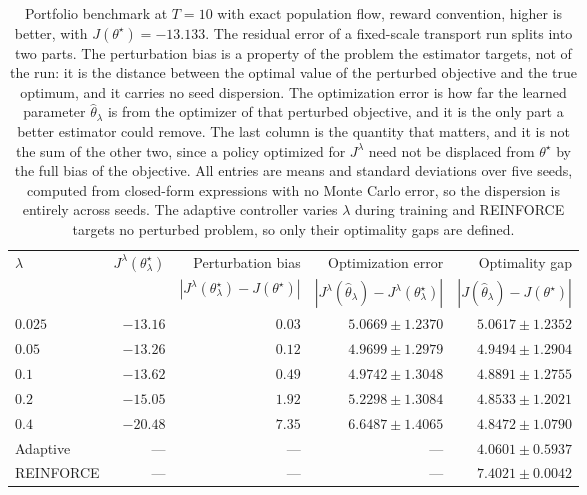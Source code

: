 \begin{table}[H]
\centering
\small
\begin{tabular}{lrrrr}
\toprule
$\lambda$ & $J^\lambda(\theta_\lambda^\star)$ & Perturbation bias & Optimization error & Optimality gap \\
& & $|J^\lambda(\theta_\lambda^\star)-J(\theta^\star)|$ & $|J^\lambda(\widehat\theta_\lambda)-J^\lambda(\theta_\lambda^\star)|$ & $|J(\widehat\theta_\lambda)-J(\theta^\star)|$ \\
\midrule
$0.025$ & $-13.16$ & $0.03$ & $5.0669\pm1.2370$ & $5.0617\pm1.2352$ \\
$0.05$ & $-13.26$ & $0.12$ & $4.9699\pm1.2979$ & $4.9494\pm1.2904$ \\
$0.1$ & $-13.62$ & $0.49$ & $4.9742\pm1.3048$ & $4.8891\pm1.2755$ \\
$0.2$ & $-15.05$ & $1.92$ & $5.2298\pm1.3084$ & $4.8533\pm1.2021$ \\
$0.4$ & $-20.48$ & $7.35$ & $6.6487\pm1.4065$ & $4.8472\pm1.0790$ \\
\midrule
Adaptive & --- & --- & --- & $4.0601\pm0.5937$ \\
REINFORCE & --- & --- & --- & $7.4021\pm0.0042$ \\
\bottomrule
\end{tabular}
\caption{Portfolio benchmark at $T=10$ with exact population flow, reward convention, higher is better, with $J(\theta^\star)=-13.133$. The residual error of a fixed-scale transport run splits into two parts. The perturbation bias is a property of the problem the estimator targets, not of the run: it is the distance between the optimal value of the perturbed objective and the true optimum, and it carries no seed dispersion. The optimization error is how far the learned parameter $\widehat\theta_\lambda$ is from the optimizer of that perturbed objective, and it is the only part a better estimator could remove. The last column is the quantity that matters, and it is not the sum of the other two, since a policy optimized for $J^\lambda$ need not be displaced from $\theta^\star$ by the full bias of the objective. All entries are means and standard deviations over five seeds, computed from closed-form expressions with no Monte Carlo error, so the dispersion is entirely across seeds. The adaptive controller varies $\lambda$ during training and REINFORCE targets no perturbed problem, so only their optimality gaps are defined.}
\label{tab:portfolio-decomposition}
\end{table}
